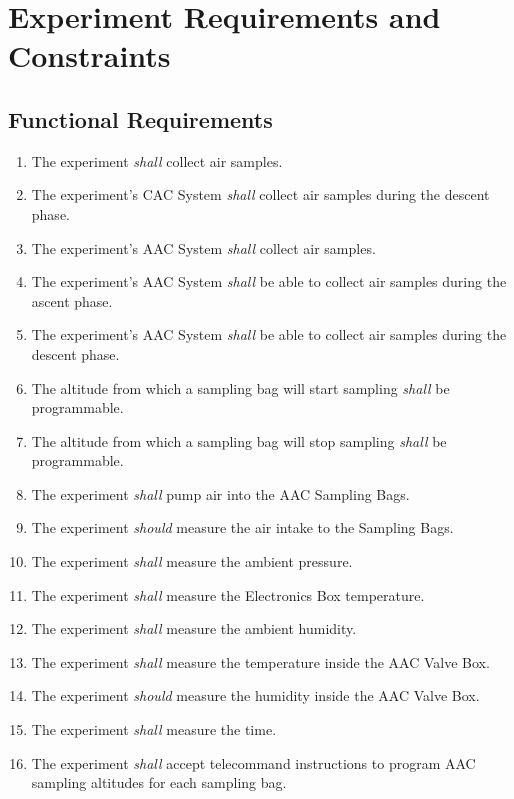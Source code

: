 \documentclass[a4paper,12pt,twoside]{article}
\begin{document}
\pagebreak
\section{Experiment Requirements and Constraints}

\subsection{Functional Requirements}

\begin{enumerate}[label=F.\arabic*]
    \item The experiment \textit{shall} collect air samples.
    \item The experiment's CAC System \textit{shall} collect air samples during the descent phase.
    \item The experiment's AAC System \textit{shall} collect air samples.
    \item The experiment's AAC System \textit{shall} be able to collect air samples during the ascent phase.
    \item The experiment's AAC System \textit{shall} be able to collect air samples during the descent phase.
    \item The altitude from which a sampling bag will start sampling \textit{shall} be programmable.
    \item The altitude from which a sampling bag will stop sampling \textit{shall} be programmable.
    \item The experiment \textit{shall} pump air into the AAC Sampling Bags.
    \item The experiment \textit{should} measure the air intake to the Sampling Bags.
    \item The experiment \textit{shall} measure the ambient pressure.
    \item The experiment \textit{shall} measure the Electronics Box temperature.
    \item The experiment \textit{shall} measure the ambient humidity.
    \item The experiment \textit{shall} measure the temperature inside the AAC Valve Box.
    \item The experiment \textit{should} measure the humidity inside the AAC Valve Box.
    \item The experiment \textit{shall} measure the time.
    \item The experiment \textit{shall} accept telecommand instructions to program AAC sampling altitudes for each sampling bag.

\end{enumerate}
\end{document}
